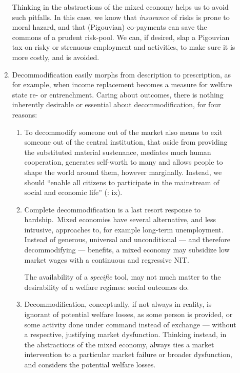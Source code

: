 \begin{description}
\begin{enumerate}
		Thinking in the abstractions of the mixed economy helps us to avoid such pitfalls. In this case, we know that \emph{insurance} of risks is prone to moral hazard, and that (Pigouvian) co-payments can save the commons of a prudent risk-pool. We can, if desired, slap a Pigouvian tax on risky or strenuous employment and activities, to make sure it is more costly, and is avoided.
		
		\item Decommodification easily morphs from description to prescription, as for example, when income replacement becomes a measure for welfare state re- or entrenchment. %
		Caring about outcomes, there is nothing inherently desirable or essential about decommodification, for four reasons:
			\begin{enumerate}
				\item To decommodify someone out of the market also means to exit someone out of the central institution, that aside from providing the substituted material sustenance, mediates much human cooperation, generates self-worth to many and allows people to shape the world around them, however marginally. Instead, we should ``enable all citizens to participate in the mainstream of social and economic life'' (\citealt{Esping-Andersen2002}: ix).

				\item Complete decommodification is a last resort response to hardship.~Mixed economies have several alternative, and less intrusive, approaches to, for example long-term unemployment. Instead of generous, universal and unconditional --- and therefore decommodifying --- benefits, a mixed economy may subsidize low market wages with a continuous and regressive \gls{NIT}. 
				
				The availability of a \emph{specific} tool, may not much matter to the desirability of a welfare regimes: social outcomes do.

				\item Decommodification, conceptually, if not always in reality, is ignorant of potential welfare losses, as some person is provided, or some activity done under command instead of exchange --- without a respective, justifying market dysfunction. Thinking instead, in the abstractions of the mixed economy, always ties a market intervention to a particular market failure or broader dysfunction, and considers the potential welfare losses.
			\end{enumerate} 
			

\end{enumerate}
\end{description}
